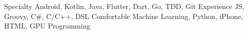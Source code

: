 
\begin{cvskills}
	\cvskill
		{Specialty}
		{
		Android,\enskip 
		Kotlin,\enskip
		Java,\enskip  
		Flutter,\enskip
		Dart,\enskip
		Go,\enskip
		TDD,\enskip
		Git
		}
	\cvskill
		{Experience}
		{ 
		JS,\enskip
		Groovy,\enskip 
		C\#,\enskip 
		C/C++,\enskip
		DSL
		}
	\cvskill
		{Comfortable}
		{ 
		Machine Learning,\enskip 
		Python,\enskip
		iPhone,\enskip
		HTML,\enskip
		GPU Programming
		}
\end{cvskills}

